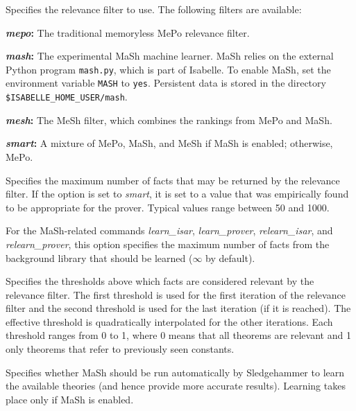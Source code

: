 \documentclass[a4paper,12pt]{article}
\begin{document}
\begin{enum}
Specifies the relevance filter to use. The following filters are available:

\begin{enum}
\item[\labelitemi] \textbf{\textit{mepo}:}
The traditional memoryless MePo relevance filter.

\item[\labelitemi] \textbf{\textit{mash}:}
The experimental MaSh machine learner. MaSh relies on the external Python
program \texttt{mash.py}, which is part of Isabelle. To enable MaSh, set the
environment variable \texttt{MASH} to \texttt{yes}. Persistent data is stored in
the directory \texttt{\$ISABELLE\_HOME\_USER/mash}.

\item[\labelitemi] \textbf{\textit{mesh}:} The MeSh filter, which combines the
rankings from MePo and MaSh.

\item[\labelitemi] \textbf{\textit{smart}:} A mixture of MePo, MaSh, and MeSh if
MaSh is enabled; otherwise, MePo.
\end{enum}

Specifies the maximum number of facts that may be returned by the relevance
filter. If the option is set to \textit{smart}, it is set to a value that was
empirically found to be appropriate for the prover. Typical values range between
50 and 1000.

For the MaSh-related commands \textit{learn\_isar}, \textit{learn\_prover},
\textit{relearn\_isar}, and \textit{relearn\_prover}, this option specifies the
maximum number of facts from the background library that should be learned
($\infty$ by default).

Specifies the thresholds above which facts are considered relevant by the
relevance filter. The first threshold is used for the first iteration of the
relevance filter and the second threshold is used for the last iteration (if it
is reached). The effective threshold is quadratically interpolated for the other
iterations. Each threshold ranges from 0 to 1, where 0 means that all theorems
are relevant and 1 only theorems that refer to previously seen constants.

Specifies whether MaSh should be run automatically by Sledgehammer to learn the
available theories (and hence provide more accurate results). Learning takes
place only if MaSh is enabled.


\end{enum}
\end{document}
